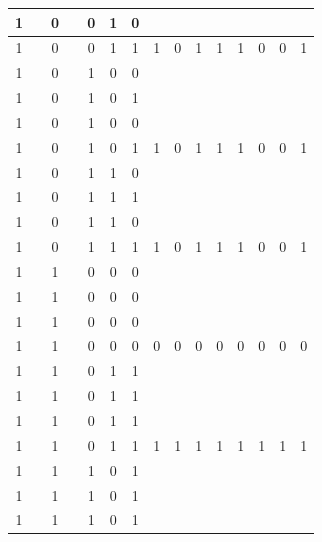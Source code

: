 \begin{table}[!tb]
\begin{tabular}{|c|c|c|c|c|c|c|c|c|c|c|c|c|c|c|}
        \rowcolor{yellow!40} 1 &  & 0 &  & 0 & 1 & 0 &  &  &  &  &  &  &  &  \\ \hline
        \rowcolor{yellow!40} 1 &  & 0 &  & 0 & 1 & 1 & 1 & 0 & 1 & 1 & 1 & 0 & 0 & 1 \\ \hline
        \rowcolor{gray!40} 1 &  & 0 &  & 1 & 0 & 0 &  &  &  &  &  &  &  &  \\ \hline
        \rowcolor{gray!40} 1 &  & 0 &  & 1 & 0 & 1 &  &  &  &  &  &  &  &  \\ \hline
        \rowcolor{gray!40} 1 &  & 0 &  & 1 & 0 & 0 &  &  &  &  &  &  &  &  \\ \hline
        \rowcolor{gray!40} 1 &  & 0 &  & 1 & 0 & 1 & 1 & 0 & 1 & 1 & 1 & 0 & 0 & 1 \\ \hline
        \rowcolor{blue!40} 1 &  & 0 &  & 1 & 1 & 0 &  &  &  &  &  &  &  &  \\ \hline
        \rowcolor{blue!40} 1 &  & 0 &  & 1 & 1 & 1 &  &  &  &  &  &  &  &  \\ \hline
        \rowcolor{blue!40} 1 &  & 0 &  & 1 & 1 & 0 &  &  &  &  &  &  &  &  \\ \hline
        \rowcolor{blue!40} 1 &  & 0 &  & 1 & 1 & 1 & 1 & 0 & 1 & 1 & 1 & 0 & 0 & 1 \\ \hline
        \rowcolor{red!40} 1 &  & 1 &  & 0 & 0 & 0 &  &  &  &  &  &  &  &  \\ \hline
        \rowcolor{red!40} 1 &  & 1 &  & 0 & 0 & 0 &  &  &  &  &  &  &  &  \\ \hline
        \rowcolor{red!40} 1 &  & 1 &  & 0 & 0 & 0 &  &  &  &  &  &  &  &  \\ \hline
        \rowcolor{red!40} 1 &  & 1 &  & 0 & 0 & 0 & 0 & 0 & 0 & 0 & 0 & 0 & 0 & 0 \\ \hline
        \rowcolor{green!40} 1 &  & 1 &  & 0 & 1 & 1 &  &  &  &  &  &  &  &  \\ \hline
        \rowcolor{green!40} 1 &  & 1 &  & 0 & 1 & 1 &  &  &  &  &  &  &  &  \\ \hline
        \rowcolor{green!40} 1 &  & 1 &  & 0 & 1 & 1 &  &  &  &  &  &  &  &  \\ \hline
        \rowcolor{green!40} 1 &  & 1 &  & 0 & 1 & 1 & 1 & 1 & 1 & 1 & 1 & 1 & 1 & 1 \\ \hline
        \rowcolor{yellow!40} 1 &  & 1 &  & 1 & 0 & 1 &  &  &  &  &  &  &  &  \\ \hline
        \rowcolor{yellow!40} 1 &  & 1 &  & 1 & 0 & 1 &  &  &  &  &  &  &  &  \\ \hline
        \rowcolor{yellow!40} 1 &  & 1 &  & 1 & 0 & 1 &  &  &  &  &  &  &  &  \\ \hline

\end{tabular}
\end{table}
